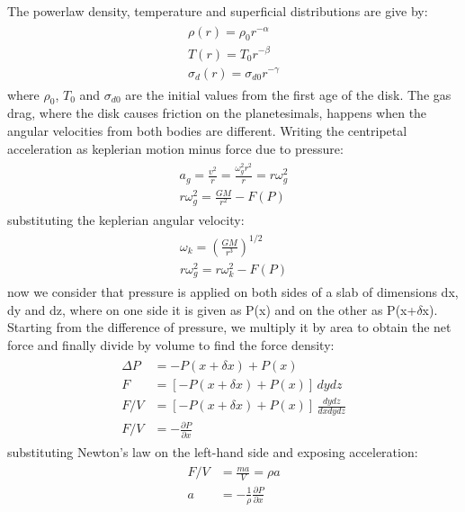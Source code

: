 \documentclass[12pt,a4paper]{article}
\begin{document}
The powerlaw density, temperature and superficial distributions are give by:
\begin{align}
    \begin{split}
        \rho(r)=\rho_0r^{-\alpha} \\
        T(r)=T_0r^{-\beta} \\
        \sigma_d(r)=\sigma_{d0}r^{-\gamma}
    \end{split}
\end{align}
where $\rho_0$, $T_0$ and $\sigma_{d0}$ are the initial values from the first age of the disk. The gas drag, where the disk causes friction on the planetesimals, happens when the angular velocities from both bodies are different. Writing the centripetal acceleration as keplerian motion minus force due to pressure:
\begin{align}
\begin{split}
    a_g=\frac{v^2}{r}=\frac{\omega^2_gr^2}{r}=r\omega_g^2 \\
    r\omega^2_g=\frac{GM}{r^2}-F(P)
\end{split}    
\end{align}
substituting the keplerian angular velocity:
\begin{align}
    \begin{split}
        \omega_k=(\frac{GM}{r^3})^{1/2} \\
        r\omega^2_g=r\omega^2_k-F(P)
    \end{split}
\end{align}
now we consider that pressure is applied on both sides of a slab of dimensions dx, dy and dz, where on one side it is given as P(x) and on the other as P(x+$\delta$x). Starting from the difference of pressure, we multiply it by area to obtain the net force and finally divide by volume to find the force density:
\begin{align}
    \begin{split}
        \Delta P&=-P(x+\delta x) +P(x) \\
        F&=[-P(x+\delta x)+P(x)]\,dydz \\
        F/V&=[-P(x+\delta x)+P(x)]\,\frac{dydz}{dxdydz} \\
        F/V&=-\frac{\partial P}{\partial x}
    \end{split}
\end{align}
substituting Newton's law on the left-hand side and exposing acceleration:
\begin{align}
\begin{split}
    F/V&=\frac{ma}{V}=\rho a \\
    a&=-\frac{1}{\rho}\frac{\partial P}{\partial x}
\end{split}
\end{align}
\end{document}
